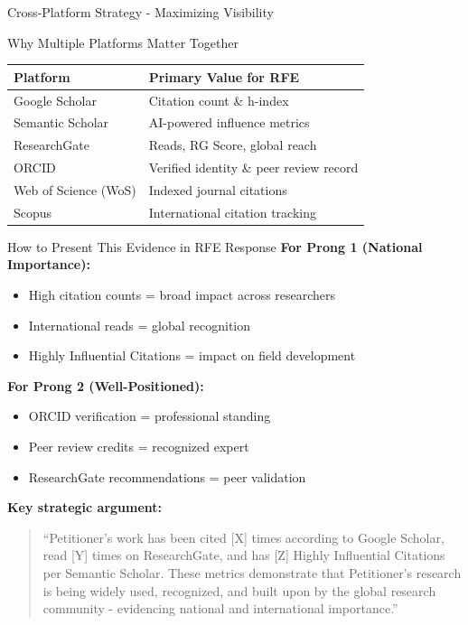\documentclass[11pt]{beamer}
\begin{document}
	\begin{frame}{Cross-Platform Strategy - Maximizing Visibility}
		\scriptsize
		\begin{block}{Why Multiple Platforms Matter Together}
			\centering
			\begin{tabular}{|p{4cm}|p{5cm}|}
				\hline
				\textbf{Platform} & \textbf{Primary Value for RFE} \\
				\hline
				Google Scholar & Citation count \& h-index \\
				\hline
				Semantic Scholar & AI-powered influence metrics \\
				\hline
				ResearchGate & Reads, RG Score, global reach \\
				\hline
				ORCID & Verified identity \& peer review record \\
				\hline
				Web of Science (WoS) & Indexed journal citations \\
				\hline
				Scopus & International citation tracking \\
				\hline
			\end{tabular}
		\end{block}
		
		\begin{block}{How to Present This Evidence in RFE Response}
			\textbf{For Prong 1 (National Importance):}
			\begin{itemize}
				\item High citation counts = broad impact across researchers
				\item International reads = global recognition
				\item Highly Influential Citations = impact on field development
			\end{itemize}
			\textbf{For Prong 2 (Well-Positioned):}
			\begin{itemize}
				\item ORCID verification = professional standing
				\item Peer review credits = recognized expert
				\item ResearchGate recommendations = peer validation
			\end{itemize}
			\textbf{Key strategic argument:}
			\begin{quote}
				``Petitioner's work has been cited [X] times according to Google Scholar, read [Y] times on ResearchGate, and has [Z] Highly Influential Citations per Semantic Scholar. These metrics demonstrate that Petitioner's research is being widely used, recognized, and built upon by the global research community - evidencing national and international importance.''
			\end{quote}
		\end{block}
	\end{frame}
	
\end{document}
